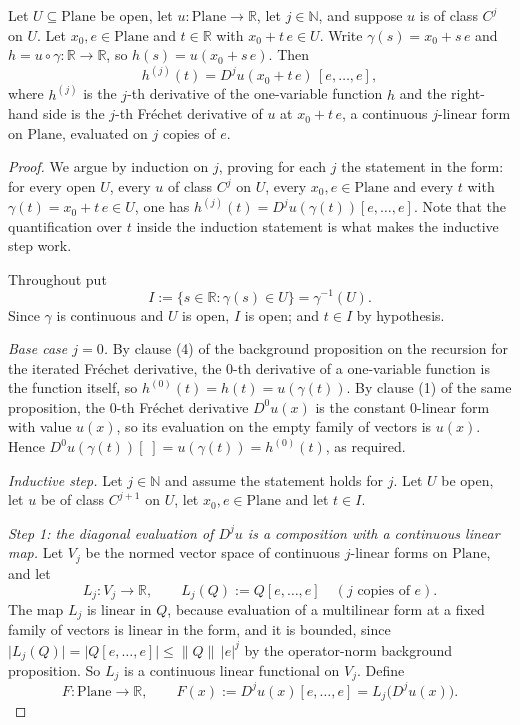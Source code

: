 \begin{lemma}
Let $U\subseteq\mathrm{Plane}$ be open, let $u\colon\mathrm{Plane}\to\mathbb{R}$, let
$j\in\mathbb{N}$, and suppose $u$ is of class $C^{j}$ on $U$.  Let $x_0,e\in\mathrm{Plane}$ and
$t\in\mathbb{R}$ with $x_0+t\,e\in U$.  Write $\gamma(s)=x_0+s\,e$ and
$h=u\circ\gamma\colon\mathbb{R}\to\mathbb{R}$, so $h(s)=u(x_0+s\,e)$.  Then
\[
  h^{(j)}(t)=D^{j}u(x_0+t\,e)\,[e,\ldots,e],
\]
where $h^{(j)}$ is the $j$-th derivative of the one-variable function $h$ and the right-hand
side is the $j$-th Fr\'echet derivative of $u$ at $x_0+t\,e$, a continuous $j$-linear form on
$\mathrm{Plane}$, evaluated on $j$ copies of $e$.
\end{lemma}
\begin{proof}
We argue by induction on $j$, proving for each $j$ the statement in the form: for every open
$U$, every $u$ of class $C^{j}$ on $U$, every $x_0,e\in\mathrm{Plane}$ and every $t$ with
$\gamma(t)=x_0+t\,e\in U$, one has $h^{(j)}(t)=D^{j}u(\gamma(t))[e,\ldots,e]$.  Note that the
quantification over $t$ inside the induction statement is what makes the inductive step work.

Throughout put
\[
  I:=\{s\in\mathbb{R}:\gamma(s)\in U\}=\gamma^{-1}(U).
\]
Since $\gamma$ is continuous and $U$ is open, $I$ is open; and $t\in I$ by hypothesis.

\medskip\noindent\emph{Base case $j=0$.}
By clause (4) of the background proposition on the recursion for the iterated Fr\'echet
derivative, the $0$-th derivative of a one-variable function is the function itself, so
$h^{(0)}(t)=h(t)=u(\gamma(t))$.  By clause (1) of the same proposition, the $0$-th Fr\'echet
derivative $D^{0}u(x)$ is the constant $0$-linear form with value $u(x)$, so its evaluation on
the empty family of vectors is $u(x)$.  Hence $D^{0}u(\gamma(t))[\;]=u(\gamma(t))=h^{(0)}(t)$, as
required.

\medskip\noindent\emph{Inductive step.}
Let $j\in\mathbb{N}$ and assume the statement holds for $j$.  Let $U$ be open, let $u$ be of
class $C^{j+1}$ on $U$, let $x_0,e\in\mathrm{Plane}$ and let $t\in I$.

\emph{Step 1: the diagonal evaluation of $D^{j}u$ is a composition with a continuous linear
map.}  Let $V_j$ be the normed vector space of continuous $j$-linear forms on
$\mathrm{Plane}$, and let
\[
  L_j\colon V_j\to\mathbb{R},\qquad L_j(Q):=Q[e,\ldots,e]\quad(j\text{ copies of }e).
\]
The map $L_j$ is linear in $Q$, because evaluation of a multilinear form at a fixed family of
vectors is linear in the form, and it is bounded, since
$\lvert L_j(Q)\rvert=\lvert Q[e,\ldots,e]\rvert\le\lVert Q\rVert\,\lvert e\rvert^{j}$ by the
operator-norm background proposition.  So $L_j$ is a continuous linear functional on $V_j$.
Define
\[
  F\colon\mathrm{Plane}\to\mathbb{R},\qquad F(x):=D^{j}u(x)[e,\ldots,e]=L_j\bigl(D^{j}u(x)\bigr).
\]


\end{proof}
